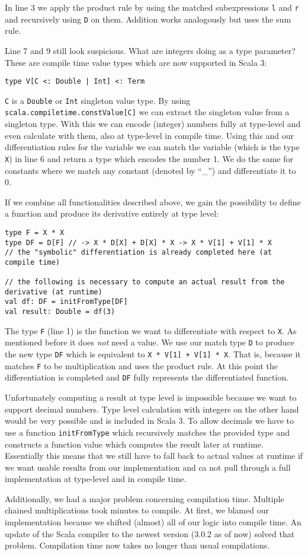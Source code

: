 In line 3 we apply the product rule by using the matched subexpressions \lstinline{l} and \lstinline{r} and recursively using \lstinline{D} on them. Addition works analogously but uses the sum rule.

Line 7 and 9 still look suspicious. What are integers doing as a type parameter? These are compile time value types which are now supported in Scala 3:
\begin{lstlisting}
type V[C <: Double | Int] <: Term
\end{lstlisting}
\lstinline{C} is a \lstinline{Double} or \lstinline{Int} singleton value type. By using \lstinline{scala.compiletime.constValue[C]} we can extract the singleton value from a singleton type. With this we can encode (integer) numbers fully at type-level and even calculate with them, also at type-level in compile time. Using this and our differentiation rules for the variable we can match the variable (which is the type \lstinline{X}) in line 6 and return a type which encodes the number 1. We do the same for constants where we match any constant (denoted by ``\_'') and differentiate it to 0.

If we combine all functionalities described above, we gain the possibility to define a function and produce its derivative entirely at type level:
\begin{lstlisting}
type F = X * X
type DF = D[F] // -> X * D[X] + D[X] * X -> X * V[1] + V[1] * X
// the "symbolic" differentiation is already completed here (at compile time)

// the following is necessary to compute an actual result from the derivative (at runtime)
val df: DF = initFromType[DF] 
val result: Double = df(3)
\end{lstlisting}
The type \lstinline{F} (line 1) is the function we want to differentiate with respect to \lstinline{X}. As mentioned before it does \emph{not} need a value. We use our match type \lstinline{D} to produce the new type \lstinline{DF} which is equivalent to \lstinline{X * V[1] + V[1] * X}. That is, because it matches \lstinline{F} to be multiplication and uses the product rule. At this point the differentiation is completed and \lstinline{DF} fully represents the differentiated function.

Unfortunately computing a result at type level is impossible because we want to support decimal numbers. Type level calculation with integers on the other hand would be very possible and is included in Scala 3. To allow decimals we have to use a function \lstinline{initFromType} which recursively matches the provided type and constructs a function value which computes the result later at runtime. Essentially this means that we still have to fall back to actual values at runtime if we want usable results from our implementation and ca not pull through a full implementation at type-level and in compile time.

Additionally, we had a major problem concerning compilation time. Multiple chained multiplications took minutes to compile. At first, we blamed our implementation because we shifted (almost) all of our logic into compile time. An update of the Scala compiler to the newest version (3.0.2 as of now) solved that problem. Compilation time now takes no longer than usual compilations.
